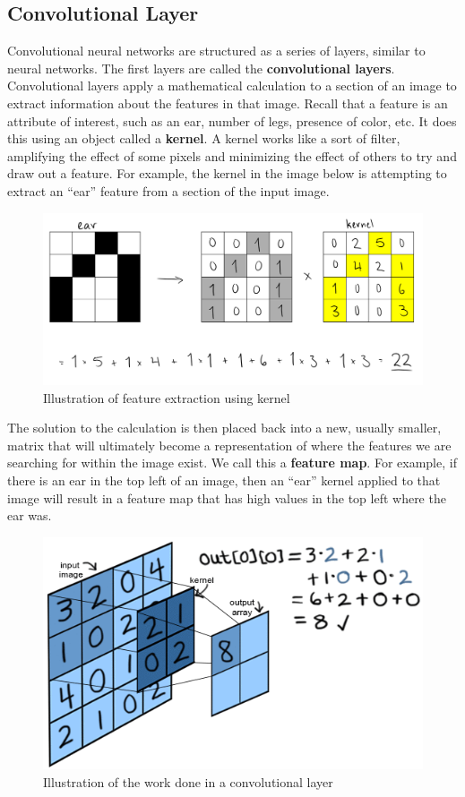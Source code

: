     \subsection{Convolutional Layer}
        Convolutional neural networks are structured as a series of layers, similar to neural networks. The first layers are called the \textbf{convolutional layers}. Convolutional layers apply a mathematical calculation to a section of an image to extract information about the features in that image. Recall that a feature is an attribute of interest, such as an ear, number of legs, presence of color, etc. It does this using an object called a \textbf{kernel}. A kernel works like a sort of filter, amplifying the effect of some pixels and minimizing the effect of others to try and draw out a feature. For example, the kernel in the image below is attempting to extract an ``ear'' feature from a section of the input image. 
        \begin{figure}[H]
            \centering
            \includegraphics[width=1\linewidth]{cv/kernelextraction.png}
            \caption{Illustration of feature extraction using kernel}
            \label{fig:kernelextraction}
        \end{figure}

        The solution to the calculation is then placed back into a new, usually smaller, matrix that will ultimately become a representation of where the features we are searching for within the image exist. We call this a \textbf{feature map}. For example, if there is an ear in the top left of an image, then an ``ear'' kernel applied to that image will result in a feature map that has high values in the top left where the ear was. 

        \begin{figure}[H]
            \centering
            \includegraphics[width=0.75\linewidth]{cv/imagetokerneltosmallmatrix.png}
            \caption{Illustration of the work done in a convolutional layer}
            \label{fig:imagetokerneltosmallmatrix}
        \end{figure}

